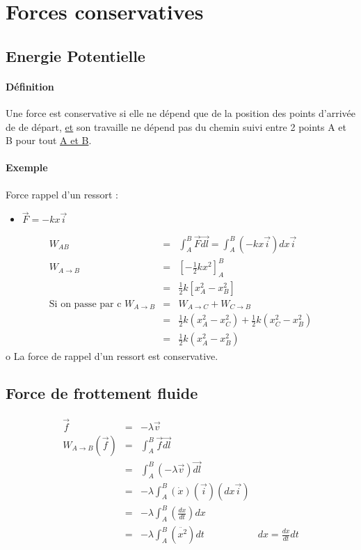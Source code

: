 \section{Forces conservatives}
\subsection{Energie Potentielle}

\paragraph{Définition} Une force est conservative si elle ne dépend que de la position des points d'arrivée de de départ, \ul{et} son travaille ne dépend pas du chemin suivi entre 2 points A et B pour tout \ul{A et B}.

\paragraph{Exemple}

Force rappel d'un ressort : 

\begin{itemize}
	\item $\vec{F} = -kx\vec{i}$
\end{itemize}
\[\begin{array}{rcl}
		W_{AB} &=& \int_A^B \vec{F}\vec{dl} = \int_A^B (-kx\vec{i}) dx\vec{i} \\
		W_{A \to B} &=& [-\frac{1}{2}kx^2]^B_A \\
			   &=& \frac{1}{2}k[x^2_A - x^2_B] \\
\text{Si on passe par c } W_{A\to B} &=& W_{A \to C} + W_{C \to B} \\
			   &=& \frac{1}{2}k(x^2_A - x^2_C) + \frac{1}{2}k(x^2_C-x^2_B) \\
			   &=& \frac{1}{2}k(x^2_A - x^2_B)
\end{array}\]o
La force de rappel d'un ressort est conservative.

\subsection{Force de frottement fluide}

\[\begin{array}{rclr}
		\vec{f} &=& -\lambda \vec{v} \\
		W_{A \to B}(\vec{f}) &=& \int_A^B \vec{f}\vec{dl} \\
			  &=& \int_A^B(-\lambda \vec{v}) \vec{dl} \\
			   &=& -\lambda \int_A^B(\dot{x})(\vec{i})(dx\vec{i})  \\
			&=& -\lambda \int_A^B (\frac{dx}{dt}) dx  \\
			&=& -\lambda \int_A^B(\ddot{x^2}) dt & dx = \frac{dx}{dt}dt
\end{array}\]

